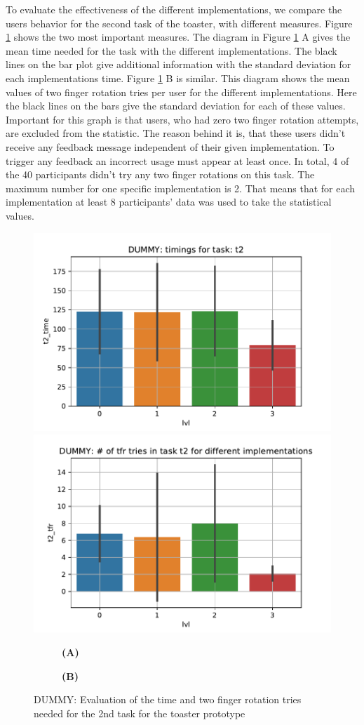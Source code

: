 \documentclass[11pt, a4paper]{article}
\begin{document}
			To evaluate the effectiveness of the different implementations, we compare the users behavior for the second task of the toaster, with different measures. Figure \ref{fig:t2_metrics} shows the two most important measures. The diagram in Figure \ref{fig:t2_metrics} A gives the mean time needed for the task with the different implementations. The black lines on the bar plot give additional information with the standard deviation for each implementations time. Figure \ref{fig:t2_metrics} B is similar. This diagram shows the mean values of two finger rotation tries per user for the different implementations. Here the black lines on the bars give the standard deviation for each of these values. Important for this graph is that users, who had zero two finger rotation attempts, are excluded from the statistic. The reason behind it is, that these users didn't receive any feedback message independent of their given implementation. To trigger any feedback an incorrect usage must appear at least once. In total, 4 of the 40 participants didn't try any two finger rotations on this task. The maximum number for one specific implementation is 2. That means that for each implementation at least 8 participants' data was used to take the statistical values.

			\begin{figure}[H]
				\centering
				\includegraphics[width=.49\textwidth]{img/plot/plot_time_barplot.pdf}
				\includegraphics[width=.49\textwidth]{img/plot/plot_tfr_barplot.pdf}
				\begin{subfigure}[t]{.49\textwidth}\centering
					\textbf{(A)}
				\end{subfigure}
				\begin{subfigure}[t]{.49\textwidth}\centering
					\textbf{(B)}
				\end{subfigure}
				\caption{DUMMY: Evaluation of the time and two finger rotation tries needed for the 2nd task for the toaster prototype}
				\label{fig:t2_metrics}
			\end{figure}
\end{document}

